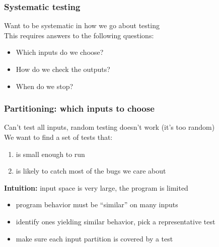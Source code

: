 \documentclass[10pt,xcolor={dvipsnames}]{beamer}
\begin{document}
\begin{frame}

\frametitle{Systematic testing}

Want to be systematic in how we go about testing
\\[1em]

This requires answers to the following questions:
\begin{itemize}
\item Which inputs do we choose?
\item How do we check the outputs?
\item When do we stop?
\end{itemize}

\end{frame}


\begin{frame}

\frametitle{Partitioning: which inputs to choose}

Can't test all inputs, random testing doesn't work (it's too random)
\\[1.5em]

We want to find a set of tests that:
\begin{enumerate}
\item is small enough to run \\[0.5em]
\item is likely to catch most of the bugs we care about \\[1.5em]
\end{enumerate}

\pause
\textbf{Intuition:} input space is very large, the program is limited
\begin{itemize}
\item program behavior must be ``similar'' on many inputs \\[0.5em]
\item identify ones yielding similar behavior, pick a representative test \\[0.5em]
\item make sure each input partition is covered by a test \\[1.5em]
\end{itemize}

\end{frame}

\end{document}
